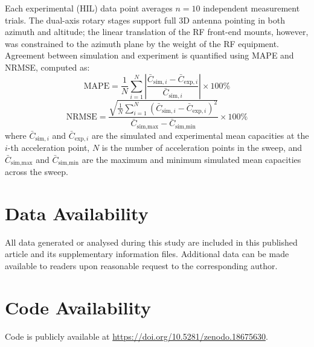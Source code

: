 \documentclass[fleqn,10pt]{wlscirep}
\newcommand{\rev}[1]{{\color{revblue}#1}}
\begin{document}
Each experimental (HIL) data point averages $n = 10$ independent measurement trials. \rev{The dual-axis rotary stages support full 3D antenna pointing in both azimuth and altitude; the linear translation of the RF front-end mounts, however, was constrained to the azimuth plane by the weight of the RF equipment.} Agreement between simulation and experiment is quantified using MAPE and NRMSE, computed as:
\begin{equation}
    \text{MAPE} = \frac{1}{N} \sum_{i=1}^{N} \left| \frac{\bar{C}_{\text{sim},i} - \bar{C}_{\text{exp},i}}{\bar{C}_{\text{sim},i}} \right| \times 100\%
\end{equation}
\begin{equation}
    \text{NRMSE} = \frac{\sqrt{\frac{1}{N}\sum_{i=1}^{N}(\bar{C}_{\text{sim},i} - \bar{C}_{\text{exp},i})^2}}{\bar{C}_{\text{sim,max}} - \bar{C}_{\text{sim,min}}} \times 100\%
\end{equation}
where $\bar{C}_{\text{sim},i}$ and $\bar{C}_{\text{exp},i}$ are the simulated and experimental mean capacities at the $i$-th acceleration point, $N$ is the number of acceleration points in the sweep, and $\bar{C}_{\text{sim,max}}$ and $\bar{C}_{\text{sim,min}}$ are the maximum and minimum simulated mean capacities across the sweep.

\section*{Data Availability}
All data generated or analysed during this study are included in this published article and its supplementary information files. Additional data can be made available to readers upon reasonable request to the corresponding author.

\section*{Code Availability}
Code is publicly available at \url{https://doi.org/10.5281/zenodo.18675630}.

\end{document}
